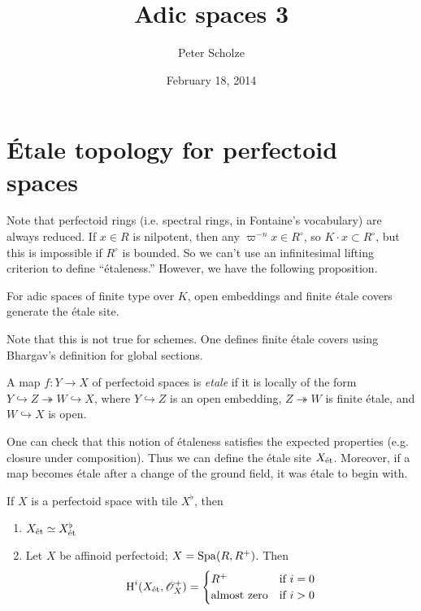 \documentclass{article}
\title{Adic spaces 3}
\author{Peter Scholze}
\date{February 18, 2014}
\begin{document}
\maketitle





\section{\'Etale topology for perfectoid spaces}

Note that perfectoid rings (i.e. spectral rings, in Fontaine's vocabulary) are always 
reduced. If $x\in R$ is nilpotent, then any $\varpi^{-n} x\in R^\circ$, so 
$K\cdot x\subset R^\circ$, but this is impossible if $R^\circ$ is bounded. So we 
can't use an infinitesimal lifting criterion to define ``\'etaleness.'' However, 
we have the following proposition. 

\begin{proposition}
For adic spaces of finite type over $K$, open embeddings and finite \'etale covers 
generate the \'etale site. 
\end{proposition}

Note that this is not true for schemes. One defines finite \'etale covers using 
Bhargav's definition for global sections. 

\begin{definition}
A map $f:Y\to X$ of perfectoid spaces is \emph{etale} if it is locally of the form 
$Y\hookrightarrow Z\twoheadrightarrow W\hookrightarrow X$, where 
$Y\hookrightarrow Z$ is an open embedding, $Z\twoheadrightarrow W$ is finite \'etale, 
and $W\hookrightarrow X$ is open. 
\end{definition}

One can check that this notion of \'etaleness satisfies the expected properties (e.g. 
closure under composition). Thus we can define the \'etale site $X_{\textnormal{\'et}}$. Moreover, 
if a map becomes \'etale after a change of the ground field, it was \'etale to 
begin with. 

\begin{proposition}
If $X$ is a perfectoid space with tile $X^\flat$, then 
\begin{enumerate}
  \item $X_{\textnormal{\'et}}\simeq X_{\textnormal{\'et}}^\flat$
  \item Let $X$ be affinoid perfectoid; $X=\operatorname{Spa}(R,R^+)$. Then 
    \[
      \operatorname{H}^i(X_{\textnormal{\'et}},\mathscr{O}_X^+) = \begin{cases} R^+ & \text{if $i=0$} \\ \text{almost zero} & \text{if $i>0$} \end{cases}
    \]
\end{enumerate}
\end{proposition}
\end{document}
